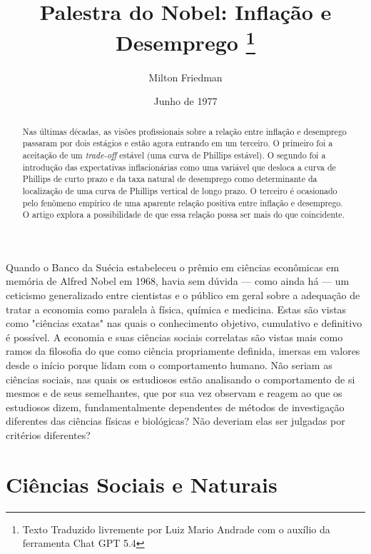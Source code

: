 \documentclass[12pt]{article}
\title{Palestra do Nobel: Inflação e Desemprego \thanks{Texto Traduzido livremente por Luiz Mario Andrade com o auxílio da ferramenta Chat GPT 5.4}}
\author{Milton Friedman}
\date{Junho de 1977}
\begin{document}
\maketitle

\begin{abstract}
Nas últimas décadas, as visões profissionais sobre a relação entre inflação e desemprego passaram por dois estágios e estão agora entrando em um terceiro. O primeiro foi a aceitação de um \textit{trade-off} estável (uma curva de Phillips estável). O segundo foi a introdução das expectativas inflacionárias como uma variável que desloca a curva de Phillips de curto prazo e da taxa natural de desemprego como determinante da localização de uma curva de Phillips vertical de longo prazo. O terceiro é ocasionado pelo fenômeno empírico de uma aparente relação positiva entre inflação e desemprego. O artigo explora a possibilidade de que essa relação possa ser mais do que coincidente.
\end{abstract}

\vspace{1cm}

Quando o Banco da Suécia estabeleceu o prêmio em ciências econômicas em memória de Alfred Nobel em 1968, havia sem dúvida — como ainda há — um ceticismo generalizado entre cientistas e o público em geral sobre a adequação de tratar a economia como paralela à física, química e medicina. Estas são vistas como "ciências exatas" nas quais o conhecimento objetivo, cumulativo e definitivo é possível. A economia e suas ciências sociais correlatas são vistas mais como ramos da filosofia do que como ciência propriamente definida, imersas em valores desde o início porque lidam com o comportamento humano. Não seriam as ciências sociais, nas quais os estudiosos estão analisando o comportamento de si mesmos e de seus semelhantes, que por sua vez observam e reagem ao que os estudiosos dizem, fundamentalmente dependentes de métodos de investigação diferentes das ciências físicas e biológicas? Não deveriam elas ser julgadas por critérios diferentes?

\section{Ciências Sociais e Naturais}
\end{document}
